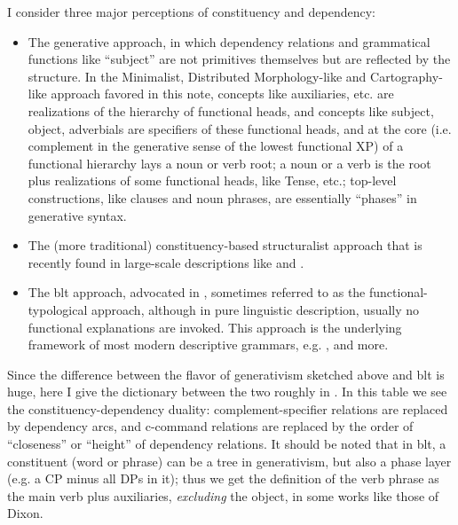 \documentclass[UTF8, a4paper, oneside, scheme=plain, 12pt]{ctexbook}
\begin{document}
{I consider three major perceptions of constituency and dependency:
\begin{itemize}
    \item The generative approach, 
        in which dependency relations and grammatical functions 
        like ``subject'' are not primitives themselves 
        but are reflected by the structure.
        In the Minimalist, Distributed Morphology-like
        and Cartography-like approach favored in this note, 
        concepts like auxiliaries, etc. are realizations of 
        the hierarchy of functional heads, 
        and concepts like subject, object, adverbials are 
        specifiers of these functional heads, 
        and at the core (i.e. complement in the generative sense of the lowest functional XP) 
        of a functional hierarchy lays 
        a noun or verb root; 
        a noun or a verb is the root plus realizations of some functional heads, 
        like Tense, etc.;
        top-level constructions, like clauses and noun phrases, 
        are essentially ``phases'' in generative syntax. 
    \item The (more traditional) constituency-based structuralist approach 
    that is recently found in large-scale descriptions like  
    \citet{cgel} and \citet{abeille2021grande}.
    \item The \ac{blt} approach, advocated in \citet{dixon2009basic1,dixon2010basic2,dixon2012basic3},
        sometimes referred to as the functional-typological approach, 
        although in pure linguistic description, 
        usually no functional explanations are invoked.
        This approach is the underlying framework 
        of most modern descriptive grammars, e.g. 
        \citet{jacques2021grammar,Friesen2017,forker2020grammar}, and more. 
\end{itemize}

Since the difference between the flavor of generativism sketched above 
and \ac{blt} is huge, 
here I give the dictionary between the two roughly in .
In this table we see the constituency-dependency duality:
complement-specifier relations are replaced by dependency arcs,
and c-command relations are replaced by the order of ``closeness'' or ``height''
of dependency relations.
It should be noted that in \ac{blt}, 
a constituent (word or phrase) can be a tree in generativism,
but also a phase layer (e.g. a CP minus all DPs in it);
thus we get the definition of the verb phrase 
as the main verb plus auxiliaries, \emph{excluding} the object, 
in some works like those of Dixon. 

}
\end{document}
